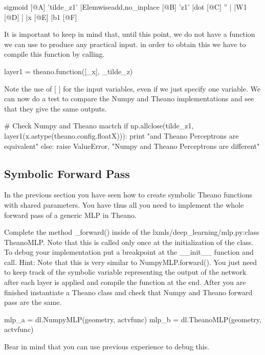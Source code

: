 \begin{exercise}
\begin{python}
sigmoid [@A] 'tilde_z1'
 |Elemwise{add,no_inplace} [@B] 'z1'
   |dot [@C] ''
   | |W1 [@D]
   | |x [@E]
   |b1 [@F]

\end{python}
It is important to keep in mind that, until this point, we do not have a
function we can use to produce any practical input. in order to obtain this we
have to compile this function by calling.    
\begin{python}
layer1 = theano.function([_x], _tilde_z)
\end{python}
Note the use of $[$ $]$ for the input variables, even if we just specify one
variable. We can now do a test to compare the Numpy and Theano implementations
and see that they give the same outputs.
\begin{python}
# Check Numpy and Theano mactch
if np.allclose(tilde_z1, layer1(x.astype(theano.config.floatX))):
    print "\nNumpy and Theano Perceptrons are equivalent"
else:
    raise ValueError, "Numpy and Theano Perceptrons are different"
\end{python}
\end{exercise}

\subsection{Symbolic Forward Pass}
In the previous section you have seen how to create symbolic Theano functions
with shared parameters. You have thus all you need to implement the whole
forward pass of a generic MLP in Theano.
\begin{exercise}
Complete the method \_forward() inside of the lxmls/deep\_learning/mlp.py:class
TheanoMLP. Note that this is called only once at the initialization of the
class. To debug your implementation put a breakpoint at the \_\_init\_\_
function and call. Hint: Note that this is very similar to NumpyMLP.forward().
You just need to keep track of the symbolic variable representing the output of
the network after each layer is applied and compile the function at the end.
After you are finished instantiate a Theano class and check that Numpy and
Theano forward pass are the same. 

\begin{python}
mlp_a = dl.NumpyMLP(geometry, actvfunc)
mlp_b = dl.TheanoMLP(geometry, actvfunc)
\end{python}

Bear in mind that you can use previous experience to debug this.

\end{exercise}

